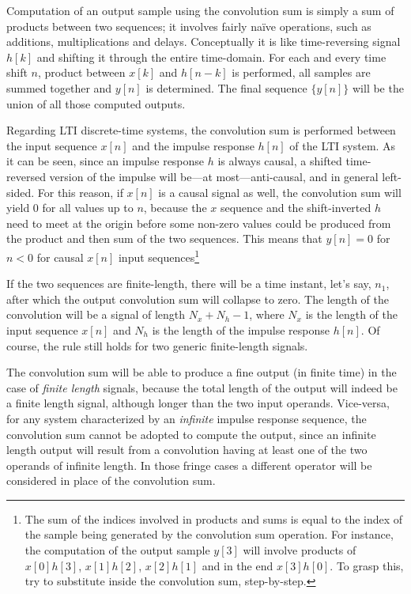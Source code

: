 \documentclass[\documentfontsize, twocolumn]{\classname}
\begin{document}
Computation of an output sample using the convolution sum is simply a sum of products between two sequences; it involves fairly na\"ive operations, such as additions, multiplications and delays. Conceptually it is like time-reversing signal $h[k]$ and shifting it through the entire time-domain. For each and every time shift $n$, product between $x[k]$ and $h[n-k]$ is performed, all samples are summed together and $y[n]$ is determined. The final sequence $\{y[n]\}$ will be the union of all those computed outputs.

Regarding LTI discrete-time systems, the convolution sum is performed between the input sequence $x[n]$ and the impulse response $h[n]$ of the LTI system. As it can be seen, since an impulse response $h$ is always causal, a shifted time-reversed version of the impulse will be---at most---anti-causal, and in general left-sided. For this reason, if $x[n]$ is a causal signal as well, the convolution sum will yield $0$ for all values up to $n$, because the $x$ sequence and the shift-inverted $h$ need to meet at the origin before some non-zero values could be produced from the product and then sum of the two sequences. This means that $y[n]=0$ for $n<0$ for causal $x[n]$ input sequences\footnote{The sum of the indices involved in products and sums is equal to the index of the sample being generated by the convolution sum operation. For instance, the computation of the output sample $y[3]$ will involve products of $x[0]h[3]$, $x[1]h[2]$, $x[2]h[1]$ and in the end $x[3]h[0]$. To grasp this, try to substitute inside the convolution sum, step-by-step.}

If the two sequences are finite-length, there will be a time instant, let's say, $n_1$, after which the output convolution sum will collapse to zero. The length of the convolution will be a signal of length $N_x + N_h - 1$, where $N_x$ is the length of the input sequence $x[n]$ and $N_h$ is the length of the impulse response $h[n]$. Of course, the rule still holds for two generic finite-length signals.

The convolution sum will be able to produce a fine output (in finite time) in the case of \emph{finite length} signals, because the total length of the output will indeed be a finite length signal, although longer than the two input operands. Vice-versa, for any system characterized by an \emph{infinite} impulse response sequence, the convolution sum cannot be adopted to compute the output, since an infinite length output will result from a convolution having at least one of the two operands of infinite length. In those fringe cases a different operator will be considered in place of the convolution sum.
\end{document}
